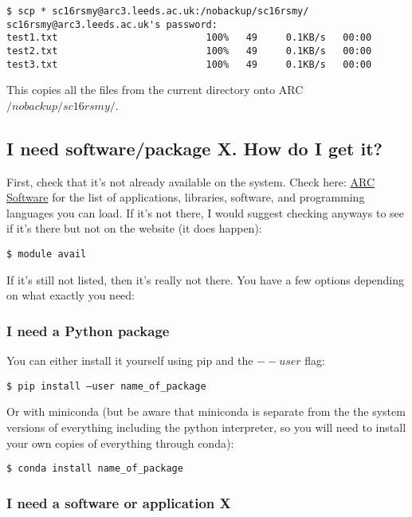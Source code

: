 \documentclass[]{article}
\begin{document}
\begin{lstlisting}
$ scp * sc16rsmy@arc3.leeds.ac.uk:/nobackup/sc16rsmy/
sc16rsmy@arc3.leeds.ac.uk's password: 
test1.txt                          100%   49     0.1KB/s   00:00    
test2.txt                          100%   49     0.1KB/s   00:00    
test3.txt                          100%   49     0.1KB/s   00:00
\end{lstlisting}

This copies all the files from the current directory onto ARC \(/nobackup/sc16rsmy/\).

\subsection{I need software/package X. How do I get it?}

First, check that it's not already available on the system. Check here: \href{http://arc.leeds.ac.uk/software/}{ARC Software} for the list of applications, libraries, software, and programming languages you can load. If it's not there, I would suggest checking anyways to see if it's there but not on the website (it does happen):

\begin{lstlisting}
$ module avail
\end{lstlisting}

If it's still not listed, then it's really not there. You have a few options depending on what exactly you need:

\subsubsection{I need a Python package}

You can either install it yourself using pip and the \(--user\) flag:
\begin{lstlisting}
$ pip install —user name_of_package
\end{lstlisting}

Or with miniconda (but be aware that miniconda is separate from the the system versions of everything including the python interpreter, so you will need to install your own copies of everything through conda):
\begin{lstlisting}
$ conda install name_of_package
\end{lstlisting}

\subsubsection{I need a software or application X}
\end{document}
